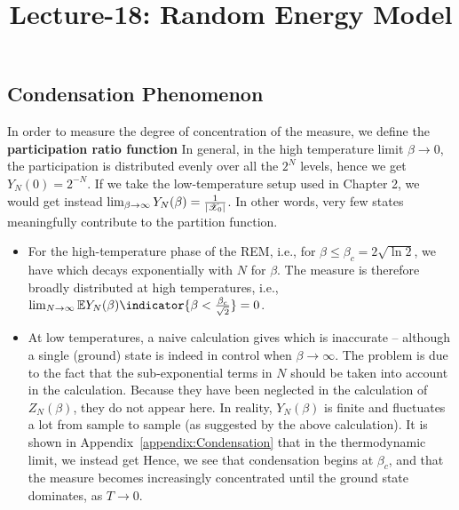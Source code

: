 \documentclass[letterpaper,english,10pt]{article}
\title{Lecture-18: Random Energy Model}
\begin{document}
\maketitle


\subsection{Condensation Phenomenon}
In order to measure the degree of concentration of the measure, we define the \textbf{participation ratio function}
In general, in the high temperature limit $\beta \to 0$, the participation is distributed evenly over all the $2^N$ levels,
hence we get $Y_N (0) = 2^{-N}$. 
If we take the low-temperature setup used in Chapter 2, we would get instead $\lim_{\beta \to \infty}Y_N(\beta) = \frac{1}{\left\lvert\mathscr{X}_0\right\rvert}$. 
In other words, very few states meaningfully contribute to the partition function.
\begin{itemize}
\item For the high-temperature phase of the REM, i.e., for $\beta \le \beta_c = 2\sqrt{\ln2}$, we have
which decays exponentially with $N$ for $\beta $. 
The measure is therefore broadly distributed at high temperatures, i.e., $\lim_{N \to \infty}\E Y_N(\beta)\indicator{\beta  < \frac{\beta_c}{\sqrt{2}}} = 0$. 
 
 \item At low temperatures, a naive calculation gives
which is inaccurate -- although a single (ground) state is indeed in control when $\beta \to \infty$. 
The problem is due to the fact that the sub-exponential terms in $N$ should be taken into account in the calculation. 
Because they have been neglected in the calculation of $Z_N(\beta)$, they do not appear here. 
In reality, $Y_N (\beta)$ is finite and fluctuates a lot from sample to sample (as suggested by the above calculation). 
It is shown in Appendix~\ref{appendix:Condensation} that in the thermodynamic limit, we instead get
Hence, we see that condensation begins at $\beta_c$, and that the measure becomes increasingly concentrated until the ground state dominates, as $T \to 0$.  
\end{itemize}
\end{document}
